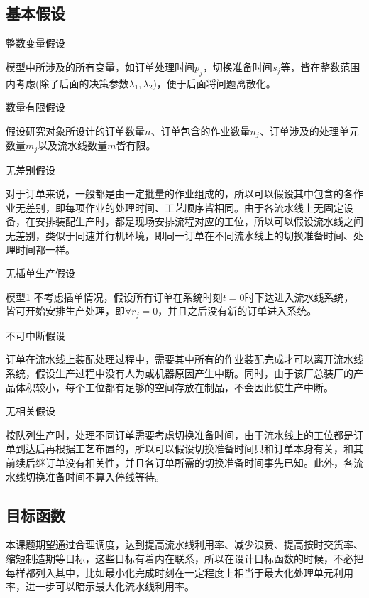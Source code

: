 \subsection{基本假设}
\begin{compactenum}
\item 整数变量假设

模型中所涉及的所有变量，如订单处理时间$p_j$，切换准备时间$s_j$等，皆在整数范围内考虑(除了后面的决策参数$\lambda_1, \lambda_2$)，便于后面将问题离散化。
\item 数量有限假设

假设研究对象所设计的订单数量$n$、订单包含的作业数量$n_j$、订单涉及的处理单元数量$m_j$以及流水线数量$m$皆有限。
\item 无差别假设

对于订单来说，一般都是由一定批量的作业组成的，所以可以假设其中包含的各作业无差别，即每项作业的处理时间、工艺顺序皆相同。由于各流水线上无固定设备，在安排装配生产时，都是现场安排流程对应的工位，所以可以假设流水线之间无差别，类似于同速并行机环境，即同一订单在不同流水线上的切换准备时间、处理时间都一样。
\item 无插单生产假设

模型1 不考虑插单情况，假设所有订单在系统时刻$t = 0$时下达进入流水线系统，皆可开始安排生产处理，即$\forall r_j =0$，并且之后没有新的订单进入系统。
\item 不可中断假设

订单在流水线上装配处理过程中，需要其中所有的作业装配完成才可以离开流水线系统，假设生产过程中没有人为或机器原因产生中断。同时，由于该厂总装厂的产品体积较小，每个工位都有足够的空间存放在制品，不会因此使生产中断。
\item 无相关假设
\end{compactenum}

按队列生产时，处理不同订单需要考虑切换准备时间，由于流水线上的工位都是订单到达后再根据工艺布置的，所以可以假设切换准备时间只和订单本身有关，和其前续后继订单没有相关性，并且各订单所需的切换准备时间事先已知。此外，各流水线切换准备时间不算入停线等待。

\subsection{目标函数}

本课题期望通过合理调度，达到提高流水线利用率、减少浪费、提高按时交货率、缩短制造期等目标，这些目标有着内在联系，所以在设计目标函数的时候，不必把每样都列入其中，比如最小化完成时刻在一定程度上相当于最大化处理单元利用率，进一步可以暗示最大化流水线利用率。

